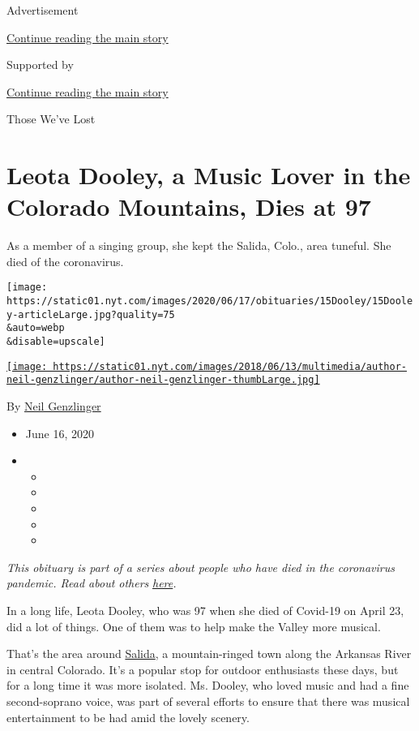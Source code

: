 Advertisement

\protect\hyperlink{after-top}{Continue reading the main story}

Supported by

\protect\hyperlink{after-sponsor}{Continue reading the main story}

Those We've Lost

\hypertarget{leota-dooley-a-music-lover-in-the-colorado-mountains-dies-at-97}{%
\section{Leota Dooley, a Music Lover in the Colorado Mountains, Dies at
97}\label{leota-dooley-a-music-lover-in-the-colorado-mountains-dies-at-97}}

As a member of a singing group, she kept the Salida, Colo., area
tuneful. She died of the coronavirus.

\texttt{[image: https://static01.nyt.com/images/2020/06/17/obituaries/15Dooley/15Dooley-articleLarge.jpg?quality=75\\\&auto=webp\\\&disable=upscale]}

\href{https://www.nytimes.com/by/neil-genzlinger}{\texttt{[image: https://static01.nyt.com/images/2018/06/13/multimedia/author-neil-genzlinger/author-neil-genzlinger-thumbLarge.jpg]}}

By \href{https://www.nytimes.com/by/neil-genzlinger}{Neil Genzlinger}

\begin{itemize}
\item
  June 16, 2020
\item
  \begin{itemize}
  \item
  \item
  \item
  \item
  \item
  \end{itemize}
\end{itemize}

\emph{This obituary is part of a series about people who have died in
the coronavirus pandemic. Read about others}
\href{https://www.nytimes.com/interactive/2020/obituaries/people-died-coronavirus-obituaries.html}{\emph{here}}\emph{.}

In a long life, Leota Dooley, who was 97 when she died of Covid-19 on
April 23, did a lot of things. One of them was to help make the Valley
more musical.

That's the area around \href{http://salida.com/}{Salida}, a
mountain-ringed town along the Arkansas River in central Colorado. It's
a popular stop for outdoor enthusiasts these days, but for a long time
it was more isolated. Ms. Dooley, who loved music and had a fine
second-soprano voice, was part of several efforts to ensure that there
was musical entertainment to be had amid the lovely scenery.

